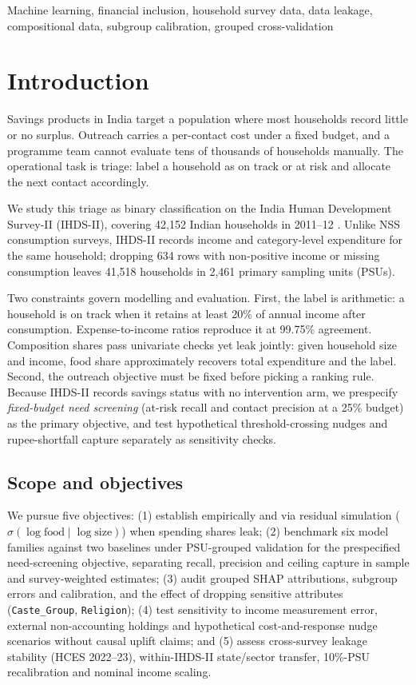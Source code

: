 \documentclass[conference]{IEEEtran}
\begin{document}
\begin{IEEEkeywords}
Machine learning, financial inclusion, household survey data, data leakage, compositional data, subgroup calibration, grouped cross-validation
\end{IEEEkeywords}

\section{Introduction}

Savings products in India target a population where most households record little or no surplus. Outreach carries a per-contact cost under a fixed budget, and a programme team cannot evaluate tens of thousands of households manually. The operational task is triage: label a household as on track or at risk and allocate the next contact accordingly.

We study this triage as binary classification on the India Human Development Survey-II (IHDS-II), covering 42,152 Indian households in 2011--12 \cite{ihds2}. Unlike NSS consumption surveys, IHDS-II records income and category-level expenditure for the same household; dropping 634 rows with non-positive income or missing consumption leaves 41,518 households in 2,461 primary sampling units (PSUs).

Two constraints govern modelling and evaluation. First, the label is arithmetic: a household is on track when it retains at least 20\% of annual income after consumption. Expense-to-income ratios reproduce it at 99.75\% agreement. Composition shares pass univariate checks yet leak jointly: given household size and income, food share approximately recovers total expenditure and the label. Second, the outreach objective must be fixed before picking a ranking rule. Because IHDS-II records savings status with no intervention arm, we prespecify \emph{fixed-budget need screening} (at-risk recall and contact precision at a 25\% budget) as the primary objective, and test hypothetical threshold-crossing nudges and rupee-shortfall capture separately as sensitivity checks.

\subsection{Scope and objectives}

We pursue five objectives: (1) establish empirically and via residual simulation ($\sigma(\log\text{food}\mid\log\text{size})$) when spending shares leak; (2) benchmark six model families against two baselines under PSU-grouped validation for the prespecified need-screening objective, separating recall, precision and ceiling capture in sample and survey-weighted estimates; (3) audit grouped SHAP attributions, subgroup errors and calibration, and the effect of dropping sensitive attributes (\texttt{Caste\_Group}, \texttt{Religion}); (4) test sensitivity to income measurement error, external non-accounting holdings and hypothetical cost-and-response nudge scenarios without causal uplift claims; and (5) assess cross-survey leakage stability (HCES 2022--23), within-IHDS-II state/sector transfer, 10\%-PSU recalibration and nominal income scaling.
\end{document}
